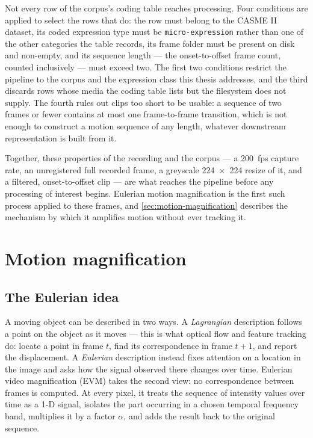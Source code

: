 Not every row of the corpus's coding table reaches processing. Four conditions are applied to select the rows that do: the row must belong to the CASME II dataset, its coded expression type must be \texttt{micro-expression} rather than one of the other categories the table records, its frame folder must be present on disk and non-empty, and its sequence length --- the onset-to-offset frame count, counted inclusively --- must exceed two. The first two conditions restrict the pipeline to the corpus and the expression class this thesis addresses, and the third discards rows whose media the coding table lists but the filesystem does not supply. The fourth rules out clips too short to be usable: a sequence of two frames or fewer contains at most one frame-to-frame transition, which is not enough to construct a motion sequence of any length, whatever downstream representation is built from it.

Together, these properties of the recording and the corpus --- a 200~fps capture rate, an unregistered full recorded frame, a greyscale 224~$\times$~224 resize of it, and a filtered, onset-to-offset clip --- are what reaches the pipeline before any processing of interest begins. Eulerian motion magnification is the first such process applied to these frames, and \autoref{sec:motion-magnification} describes the mechanism by which it amplifies motion without ever tracking it.


\section{Motion magnification}
\label{sec:motion-magnification}

\subsection{The Eulerian idea}
\label{sec:eulerian-idea}

A moving object can be described in two ways. A \textit{Lagrangian} description follows a point on the object as it moves --- this is what optical flow and feature tracking do: locate a point in frame $t$, find its correspondence in frame $t+1$, and report the displacement. A \textit{Eulerian} description instead fixes attention on a location in the image and asks how the signal observed there changes over time. Eulerian video magnification (EVM) takes the second view: no correspondence between frames is computed. At every pixel, it treats the sequence of intensity values over time as a 1-D signal, isolates the part occurring in a chosen temporal frequency band, multiplies it by a factor $\alpha$, and adds the result back to the original sequence.

